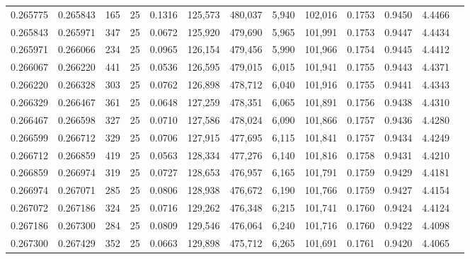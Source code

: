 \begin{tabular}{rrrrrrrrrrrrr}
0.265775 & 0.265843 &   165 &  25 &                                     0.1316 & 125,573 & 480,037 &   5,940 & 102,016 & 0.1753 & 0.9450 & 4.4466 \\
0.265843 & 0.265971 &   347 &  25 &                                     0.0672 & 125,920 & 479,690 &   5,965 & 101,991 & 0.1753 & 0.9447 & 4.4434 \\
0.265971 & 0.266066 &   234 &  25 &                                     0.0965 & 126,154 & 479,456 &   5,990 & 101,966 & 0.1754 & 0.9445 & 4.4412 \\
0.266067 & 0.266220 &   441 &  25 &                                     0.0536 & 126,595 & 479,015 &   6,015 & 101,941 & 0.1755 & 0.9443 & 4.4371 \\
0.266220 & 0.266328 &   303 &  25 &                                     0.0762 & 126,898 & 478,712 &   6,040 & 101,916 & 0.1755 & 0.9441 & 4.4343 \\
0.266329 & 0.266467 &   361 &  25 &                                     0.0648 & 127,259 & 478,351 &   6,065 & 101,891 & 0.1756 & 0.9438 & 4.4310 \\
0.266467 & 0.266598 &   327 &  25 &                                     0.0710 & 127,586 & 478,024 &   6,090 & 101,866 & 0.1757 & 0.9436 & 4.4280 \\
0.266599 & 0.266712 &   329 &  25 &                                     0.0706 & 127,915 & 477,695 &   6,115 & 101,841 & 0.1757 & 0.9434 & 4.4249 \\
0.266712 & 0.266859 &   419 &  25 &                                     0.0563 & 128,334 & 477,276 &   6,140 & 101,816 & 0.1758 & 0.9431 & 4.4210 \\
0.266859 & 0.266974 &   319 &  25 &                                     0.0727 & 128,653 & 476,957 &   6,165 & 101,791 & 0.1759 & 0.9429 & 4.4181 \\
0.266974 & 0.267071 &   285 &  25 &                                     0.0806 & 128,938 & 476,672 &   6,190 & 101,766 & 0.1759 & 0.9427 & 4.4154 \\
0.267072 & 0.267186 &   324 &  25 &                                     0.0716 & 129,262 & 476,348 &   6,215 & 101,741 & 0.1760 & 0.9424 & 4.4124 \\
0.267186 & 0.267300 &   284 &  25 &                                     0.0809 & 129,546 & 476,064 &   6,240 & 101,716 & 0.1760 & 0.9422 & 4.4098 \\
0.267300 & 0.267429 &   352 &  25 &                                     0.0663 & 129,898 & 475,712 &   6,265 & 101,691 & 0.1761 & 0.9420 & 4.4065 \\

\end{tabular}
